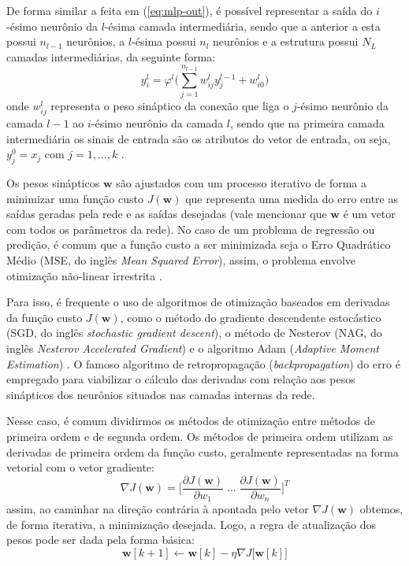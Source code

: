 \documentclass[a4paper, 12pt]{article}
\begin{document}
De forma similar a feita em (\ref{eq:mlp-out}), é possível representar a saída do $i$-ésimo neurônio da $l$-ésima camada intermediária, sendo que a anterior a esta possui $n_{l-1}$ neurônios, a $l$-ésima possui $n_l$ neurônios e a estrutura possui $N_L$ camadas intermediárias, da seguinte forma:
\begin{equation}
	y_{i}^{l} = \varphi^{l} \Big(\sum_{j=1}^{n_{l-1}} w_{ij}^{l} y_{j}^{l-1} + w_{i0}^{l} \Big)
\end{equation}
onde $w_{ij}^{l}$ representa o peso sináptico da conexão que liga o $j$-ésimo neurônio da camada $l-1$ ao $i$-ésimo neurônio da camada $l$, sendo que na primeira camada intermediária os sinais de entrada são os atributos do vetor de entrada, ou seja, $y_{j}^{0} = x_{j}$ com $j = 1, ..., k$ \cite{boccato2013novas}.

Os pesos sinápticos $\mathbf{w}$ são ajustados com um processo iterativo de forma a minimizar uma função custo $J(\mathbf{w})$ que representa uma medida do erro entre as saídas geradas pela rede e as saídas desejadas (vale mencionar que $\mathbf{w}$ é um vetor com todos os parâmetros da rede). No caso de um problema de regressão ou predição, é comum que a função custo a ser minimizada seja o Erro Quadrático Médio (MSE, do inglês \textit{Mean Squared Error}), assim, o problema envolve otimização não-linear irrestrita \cite{haykin2010neural}.

Para isso, é frequente o uso de algoritmos de otimização baseados em derivadas da função custo $J(\mathbf{w})$, como o método do gradiente descendente estocástico (SGD, do inglês \textit{stochastic gradient descent}), o método de Nesterov (NAG, do inglês \textit{Nesterov Accelerated Gradient}) e o algoritmo Adam (\textit{Adaptive Moment Estimation}) \cite{geron2019hands}. O famoso algoritmo de retropropagação (\textit{backpropagation}) do erro é empregado para viabilizar o cálculo das derivadas com relação aos pesos sinápticos dos neurônios situados nas camadas internas da rede. 

Nesse caso, é comum dividirmos os métodos de otimização entre métodos de primeira ordem e de segunda ordem. Os métodos de primeira ordem utilizam as derivadas de primeira ordem da função custo, geralmente representadas na forma vetorial com o vetor gradiente:
\begin{equation}
	\nabla J(\mathbf{w}) = \Big[\frac{\partial J(\mathbf{w})}{\partial w_1} \; ...\;  \frac{\partial J(\mathbf{w})}{\partial w_n} \Big]^T
\end{equation}
assim, ao caminhar na direção contrária à apontada pelo vetor $\nabla J(\mathbf{w})$ obtemos, de forma iterativa, a minimização desejada. Logo, a regra de atualização dos pesos pode ser dada pela forma básica:
\begin{equation}\label{mlp-w-basic}
	\mathbf{w}[k+1] \leftarrow \mathbf{w}[k] - \eta \nabla J \big[\mathbf{w}[k]\big]
\end{equation} 
\end{document}
